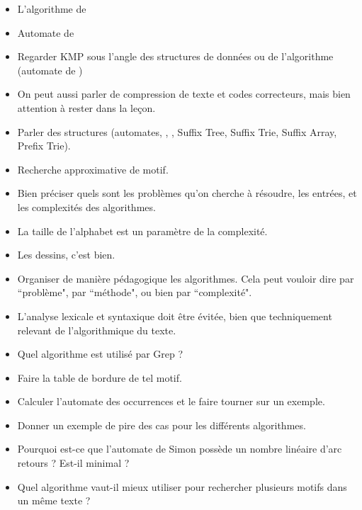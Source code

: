 \documentclass{agregfiche}
\begin{document}
\begin{itemize}
	\item L'algorithme de 
	\item Automate de 
	\item Regarder KMP sous l'angle des structures de données
	ou de l'algorithme (automate de )
	\item
	On peut aussi parler de compression de texte et codes
	correcteurs, mais bien attention à rester dans la leçon.
	\item
	Parler des structures (automates, , ,
	Suffix Tree, Suffix Trie, Suffix Array, Prefix Trie).

	\item Recherche approximative de motif.
\end{itemize}

\secpieges

\begin{itemize}
    \item Bien préciser quels sont les problèmes qu'on cherche
        à résoudre, les entrées, et les complexités des algorithmes.

    \item La taille de l'alphabet est un paramètre de la complexité.

    \item Les dessins, c'est bien.

    \item Organiser de manière pédagogique les algorithmes.
        Cela peut vouloir dire par ``problème", par ``méthode", ou
        bien par ``complexité".

    \item L'analyse lexicale et syntaxique doit être évitée, bien que techniquement
        relevant de l'algorithmique du texte.

\end{itemize}

\secquestionsclassiques

\begin{itemize}
    \item Quel algorithme est utilisé par Grep ?
    \item Faire la table de bordure de tel motif.
    \item Calculer l'automate des occurrences et le faire tourner sur un exemple.
    \item Donner un exemple de pire des cas pour les différents algorithmes.
    \item Pourquoi est-ce que l'automate de Simon possède un nombre linéaire
      d'arc retours ? Est-il minimal ?
    \item Quel algorithme vaut-il mieux utiliser pour rechercher
      plusieurs motifs dans un même texte ?
\end{itemize}
\end{document}
